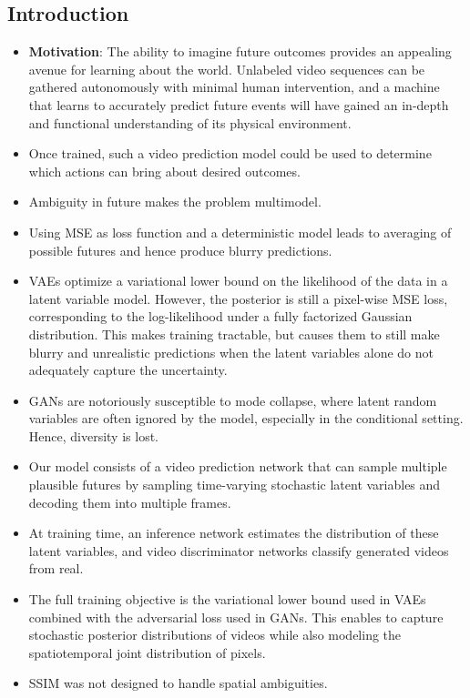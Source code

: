 \documentclass{article}
\begin{document}
    \subsection{Introduction}\label{subsec:Stochastic_Adversarial_Video_Prediction_(SAVP):introduction}
    \begin{itemize}
        \item \textbf{Motivation}: The ability to imagine future outcomes provides an appealing avenue for learning about the world.
        Unlabeled video sequences can be gathered autonomously with minimal human intervention, and a machine that learns to accurately predict future events will have gained an in-depth and functional understanding of its physical environment.
        \item Once trained, such a video prediction model could be used to determine which actions can bring about desired outcomes.
        \item Ambiguity in future makes the problem multimodel.
        \item Using MSE as loss function and a deterministic model leads to averaging of possible futures and hence produce blurry predictions.
        \item VAEs optimize a variational lower bound on the likelihood of the data in a latent variable model.
        However, the posterior is still a pixel-wise MSE loss, corresponding to the log-likelihood under a fully factorized Gaussian distribution.
        This makes training tractable, but causes them to still make blurry and unrealistic predictions when the latent variables alone do not adequately capture the uncertainty.
        \item GANs are notoriously susceptible to mode collapse, where latent random variables are often ignored by the model, especially in the conditional setting.
        Hence, diversity is lost.
        \item Our model consists of a video prediction network that can sample multiple plausible futures by sampling time-varying stochastic latent variables and decoding them into multiple frames.
        \item At training time, an inference network estimates the distribution of these latent variables, and video discriminator networks classify generated videos from real.
        \item The full training objective is the variational lower bound used in VAEs combined with the adversarial loss used in GANs. This enables to capture stochastic posterior distributions of videos while also modeling the spatiotemporal joint distribution of pixels.
        \item SSIM was not designed to handle spatial ambiguities.
    \end{itemize}
\end{document}
